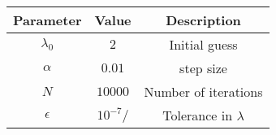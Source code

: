 
\begin{center}
\begin{tabular}{|c|c|c|}
\hline
	\textbf{Parameter}& \textbf{Value}& \textbf{Description}\\ \hline
	$\lambda_0$	&$2$		        &Initial guess\\ \hline
	$\alpha$	&$0.01$	                &step size\\ \hline
	$N$	        &$10000$                &Number of iterations\\ \hline
	$\epsilon$	&$10^{-7}/$             &Tolerance in $\lambda$\\ \hline
\end{tabular}
\end{center}
